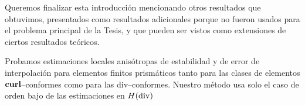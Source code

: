 Queremos finalizar esta introducción mencionando otros
resultados que obtuvimos, presentados como resultados
adicionales porque no fueron usados para el problema principal 
de la Tesis, y que pueden ser vistos como extensiones 
de ciertos resultados teóricos.

Probamos estimaciones locales anisótropas 
de estabilidad y de error 
de interpolación para elementos finitos prismáticos
tanto para las clases de elementos 
$\textbf{curl}$--conformes como para las div--conformes.
Nuestro método usa solo el caso de orden bajo de las 
estimaciones en $H(\operatorname{\textrm{div}})$
